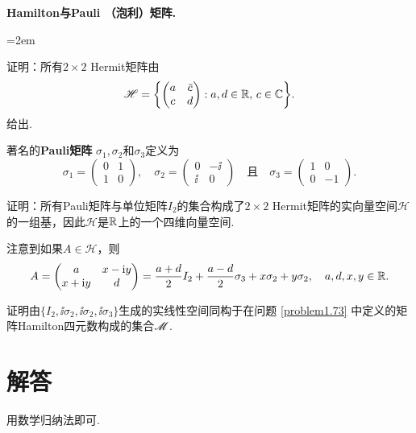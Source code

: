 \begin{mybox}
  \begin{problem}
  {\bfseries Hamilton与Pauli {\hyds （}泡利{\hyds ）}矩阵.}

  \begin{enum}\parindent=2em
    \item 证明：所有$2\times 2$ Hermit矩阵由
    \[
      \mathscr H = \left\{
        \begin{pmatrix}
          a & \bar c \\
          c & d
        \end{pmatrix}:a,d\in\MR,\,c\in\MC
      \right\}.
    \]
    给出.
    \item 著名的{\bfseries Pauli矩阵} $\sigma_1,\sigma_2$和$\sigma_3$定义为
        \[
          \sigma_1 = \begin{pmatrix}
            0 & 1 \\
            1 & 0
          \end{pmatrix},\quad \sigma_2 = \begin{pmatrix}
            0 & -\ii \\
            \ii & 0
          \end{pmatrix}\quad\text{且}\quad
          \sigma_3 = \begin{pmatrix}
            1 & 0 \\
            0 & -1
          \end{pmatrix}.
        \]

        证明：所有Pauli矩阵与单位矩阵$I_2$的集合构成了$2\times2$ Hermit矩阵的实向量空间$\mathscr H$的一组基，因此$\mathscr H$是$\mathbb R$上的一个四维向量空间.

        注意到如果$A\in\mathscr H$，则
        \[
          A = \begin{pmatrix}
            a & x - \mathrm i y\\
            x + \mathrm i y & d
          \end{pmatrix} = \frac{a+d}2I_2 + \frac{a-d}2\sigma_3 + x\sigma_2 + y\sigma_2,\quad a,d,x,y\in\mathbb R.
        \]
        \item 证明由$\{I_2,\ii\sigma_2,\ii\sigma_2,\ii\sigma_3\}$生成的实线性空间同构于在问题 \ref{problem1.73} 中定义的矩阵Hamilton四元数构成的集合$\mathscr M$.
  \end{enum}
  \end{problem}
\end{mybox}

\section{解答}
\begin{solution}
  用数学归纳法即可.
\end{solution}

